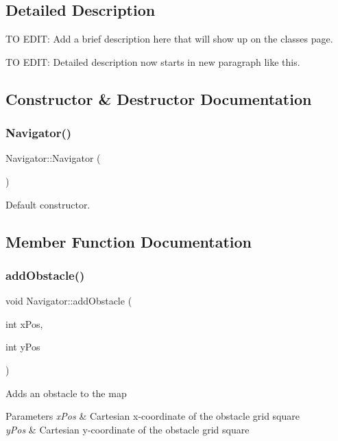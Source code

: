 \subsection{Detailed Description}
TO E\+D\+IT\+: Add a brief description here that will show up on the classes page. 

TO E\+D\+IT\+: Detailed description now starts in new paragraph like this. 

\subsection{Constructor \& Destructor Documentation}
\mbox{\label{class_navigator_a59230ab4698882f754d5ce275a1a4030}} 
\subsubsection{\texorpdfstring{Navigator()}{Navigator()}}
{\footnotesize\ttfamily Navigator\+::\+Navigator (\begin{DoxyParamCaption}{ }\end{DoxyParamCaption})}



Default constructor. 



\subsection{Member Function Documentation}
\mbox{\label{class_navigator_af5a35f0ae71309c1b276257709b24390}} 
\subsubsection{\texorpdfstring{add\+Obstacle()}{addObstacle()}}
{\footnotesize\ttfamily void Navigator\+::add\+Obstacle (\begin{DoxyParamCaption}\item[{int}]{x\+Pos,  }\item[{int}]{y\+Pos }\end{DoxyParamCaption})}

Adds an obstacle to the map


\begin{DoxyParams}{Parameters}
{\em x\+Pos} & Cartesian x-\/coordinate of the obstacle grid square \\
\hline
{\em y\+Pos} & Cartesian y-\/coordinate of the obstacle grid square \\
\hline
\end{DoxyParams}
\mbox{\label{class_navigator_a7a745d33cfa5cdfc551c87f3f23dc28e}} 
